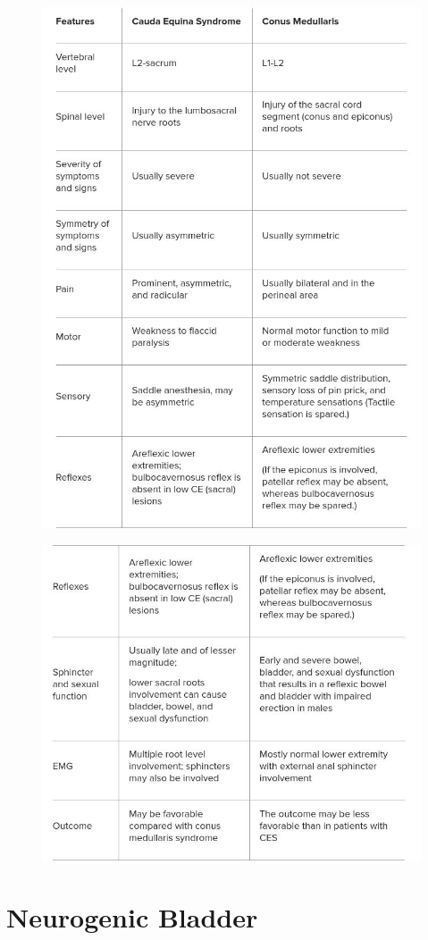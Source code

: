 \documentclass[
  12pt,
]{memoir}
\begin{document}
\begin{figure}
\centering
\includegraphics[width=.7\textwidth]{../assets/med/cauda-vs-conus-1.png}
\end{figure}
\begin{figure}
\centering
\includegraphics[width=.75\textwidth]{../assets/med/cauda-vs-conus-2.png}
\vspace{10mm}
\end{figure}

\hypertarget{neurogenic-bladder}{%
\section{Neurogenic Bladder}\label{neurogenic-bladder}}
\end{document}
